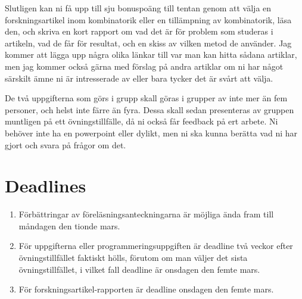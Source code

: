 \documentclass[nobib]{tufte-handout}
\begin{document}
Slutligen kan ni få upp till sju bonuspoäng till tentan genom att välja en forskningsartikel inom kombinatorik eller en tillämpning av kombinatorik, läsa den, och skriva en kort rapport om vad det är för problem som studeras i artikeln, vad de får för resultat, och en skiss av vilken metod de använder. Jag kommer att lägga upp några olika länkar till var man kan hitta sådana artiklar, men jag kommer också gärna med förslag på andra artiklar om ni har något särskilt ämne ni är intresserade av eller bara tycker det är svårt att välja.

De två uppgifterna som görs i grupp skall göras i grupper av inte mer än fem personer, och helst inte färre än fyra. Dessa skall sedan presenteras av gruppen muntligen på ett övningstillfälle, då ni också får feedback på ert arbete. Ni behöver inte ha en powerpoint eller dylikt, men ni ska kunna berätta vad ni har gjort och svara på frågor om det.

\section{Deadlines}

\begin{enumerate}
	\item Förbättringar av föreläsningsanteckningarna är möjliga ända fram till måndagen den tionde mars.
	\item För uppgifterna eller programmeringsuppgiften är deadline två veckor efter övningstillfället faktiskt hölls, förutom om man väljer det sista övningstillfället, i vilket fall deadline är onsdagen den femte mars.
	\item För forskningsartikel-rapporten är deadline onsdagen den femte mars.
\end{enumerate}
\end{document}

